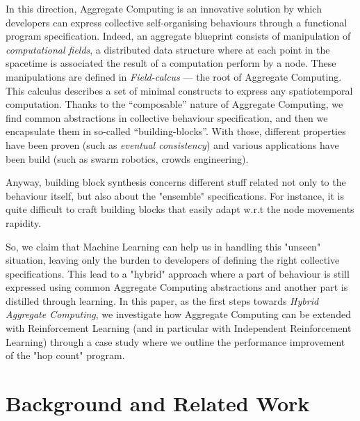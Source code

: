 \documentclass[
  twocolumn,
]{ceurart}
\begin{document}
In this direction, Aggregate Computing is an innovative solution by which 
 developers can express collective self-organising behaviours through a functional program specification.
%
Indeed, an aggregate blueprint consists of manipulation of \textit{computational fields}, a distributed
 data structure where at each point in the spacetime is associated the result of a computation
 perform by a node.
%
These manipulations are defined in \textit{Field-calcus} --- the root of Aggregate Computing. 
 This calculus describes a set of minimal constructs to express any spatiotemporal computation.
%
Thanks to the ``composable'' nature of Aggregate Computing, we find common abstractions 
 in collective behaviour specification, and then we encapsulate them in so-called ``building-blocks''.
%
With those, different properties have been proven (such as \textit{eventual consistency}) and various
 applications have been build (such as swarm robotics, crowds engineering).

Anyway, building block synthesis concerns different stuff related not only to the behaviour itself,
 but also about the "ensemble" specifications. 
 For instance, it is quite difficult to craft building blocks
 that easily adapt w.r.t the node movements rapidity.

So, we claim that Machine Learning can help us in handling this "unseen" situation, leaving only the burden
 to developers of defining the right collective specifications.
%
This lead to a "hybrid" approach where a part of behaviour is still expressed using common 
 Aggregate Computing abstractions and another part is distilled through learning.
%
In this paper, as the first steps towards \textit{Hybrid Aggregate Computing}, we investigate how Aggregate Computing can be
 extended with Reinforcement Learning (and in particular with Independent Reinforcement Learning) through a case
 study where we outline the performance improvement of the "hop count" program.

\section{Background and Related Work}
\end{document}

